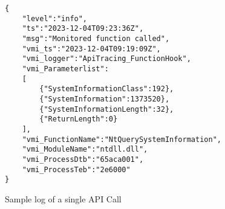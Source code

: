 \iffalse
\begin{figure*}[tb]
    \centering
\begin{verbatim}
{
    "level":"info",
    "ts":"2023-12-04T09:23:36Z",
    "msg":"Monitored function called",
    "vmi_ts":"2023-12-04T09:19:09Z",
    "vmi_logger":"ApiTracing_FunctionHook",
    "vmi_Parameterlist":"
    [
        {\"SystemInformationClass\":192},
        {\"SystemInformation\":1373520},
        {\"SystemInformationLength\":32},
        {\"ReturnLength\":0}
    ]",
    "vmi_FunctionName":"NtQuerySystemInformation", 
    "vmi_ModuleName":"ntdll.dll",
    "vmi_ProcessDtb":"65aca001",
    "vmi_ProcessTeb":"2e6000"
}
\end{verbatim}
\caption{Sample log of a single API Call}
\label{fig:json_log}
\end{figure*}
\fi

\begin{figure*}[tb]
    \centering
{}

\begin{lstlisting}[label=Sample call format]
{
    "level":"info",
    "ts":"2023-12-04T09:23:36Z",
    "msg":"Monitored function called",
    "vmi_ts":"2023-12-04T09:19:09Z",
    "vmi_logger":"ApiTracing_FunctionHook",
    "vmi_Parameterlist":
    [
        {"SystemInformationClass":192},
        {"SystemInformation":1373520},
        {"SystemInformationLength":32},
        {"ReturnLength":0}
    ],
    "vmi_FunctionName":"NtQuerySystemInformation", 
    "vmi_ModuleName":"ntdll.dll",
    "vmi_ProcessDtb":"65aca001",
    "vmi_ProcessTeb":"2e6000"
}
\end{lstlisting}

\caption{Sample log of a single API Call}
\label{fig:json_log}
\end{figure*}

